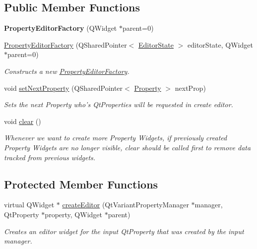 \subsection*{Public Member Functions}
\begin{DoxyCompactItemize}
\item 
\hypertarget{class_property_editor_factory_a38e3b903d6f9d5fedb2958994fe11c0c}{{\bfseries Property\-Editor\-Factory} (Q\-Widget $\ast$parent=0)}\label{class_property_editor_factory_a38e3b903d6f9d5fedb2958994fe11c0c}

\item 
\hyperlink{class_property_editor_factory_ab4a16c5976aefef936f22e2b4729ecdc}{Property\-Editor\-Factory} (Q\-Shared\-Pointer$<$ \hyperlink{class_editor_state}{Editor\-State} $>$ editor\-State, Q\-Widget $\ast$parent=0)
\begin{DoxyCompactList}\small\item\em Constructs a new \hyperlink{class_property_editor_factory}{Property\-Editor\-Factory}. \end{DoxyCompactList}\item 
void \hyperlink{class_property_editor_factory_ad20c4ac65214aebae5d340042b32231e}{set\-Next\-Property} (Q\-Shared\-Pointer$<$ \hyperlink{class_picto_1_1_property}{Property} $>$ next\-Prop)
\begin{DoxyCompactList}\small\item\em Sets the next Property who's Qt\-Properties will be requested in create editor. \end{DoxyCompactList}\item 
\hypertarget{class_property_editor_factory_aba0c6f15c9175af8e93a7ff0006fe2e7}{void \hyperlink{class_property_editor_factory_aba0c6f15c9175af8e93a7ff0006fe2e7}{clear} ()}\label{class_property_editor_factory_aba0c6f15c9175af8e93a7ff0006fe2e7}

\begin{DoxyCompactList}\small\item\em Whenever we want to create more Property Widgets, if previously created Property Widgets are no longer visible, clear should be called first to remove data tracked from previous widgets. \end{DoxyCompactList}\end{DoxyCompactItemize}
\subsection*{Protected Member Functions}
\begin{DoxyCompactItemize}
\item 
virtual Q\-Widget $\ast$ \hyperlink{class_property_editor_factory_af068c58e375e5541762d73f379b657d0}{create\-Editor} (Qt\-Variant\-Property\-Manager $\ast$manager, Qt\-Property $\ast$property, Q\-Widget $\ast$parent)
\begin{DoxyCompactList}\small\item\em Creates an editor widget for the input Qt\-Property that was created by the input manager. \end{DoxyCompactList}\end{DoxyCompactItemize}


